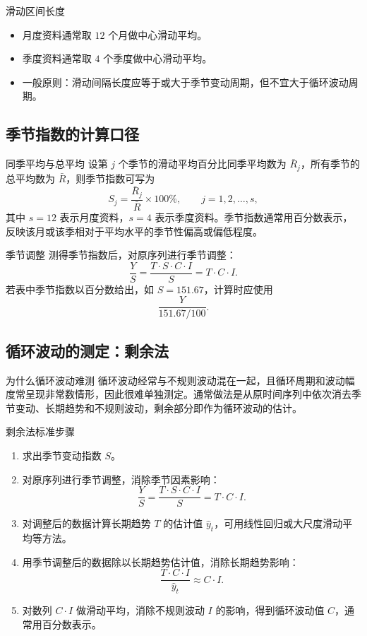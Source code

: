 \documentclass[UTF8,zihao=-4,fontset=fandol]{ctexart}
\begin{document}
\begin{warnbox}{滑动区间长度}
\begin{itemize}
  \item 月度资料通常取 $12$ 个月做中心滑动平均。
  \item 季度资料通常取 $4$ 个季度做中心滑动平均。
  \item 一般原则：滑动间隔长度应等于或大于季节变动周期，但不宜大于循环波动周期。
\end{itemize}
\end{warnbox}

\subsection{季节指数的计算口径}

\begin{keybox}{同季平均与总平均}
设第 $j$ 个季节的滑动平均百分比同季平均数为 $\bar R_j$，所有季节的总平均数为 $\bar R$，则季节指数可写为
\[
S_j=\frac{\bar R_j}{\bar R}\times 100\%,\qquad j=1,2,\ldots,s,
\]
其中 $s=12$ 表示月度资料，$s=4$ 表示季度资料。季节指数通常用百分数表示，反映该月或该季相对于平均水平的季节性偏高或偏低程度。
\end{keybox}

\begin{methodbox}{季节调整}
测得季节指数后，对原序列进行季节调整：
\[
\frac{Y}{S}
=\frac{T\cdot S\cdot C\cdot I}{S}
=T\cdot C\cdot I.
\]
若表中季节指数以百分数给出，如 $S=151.67$，计算时应使用
\[
\frac{Y}{151.67/100}.
\]
\end{methodbox}

\subsection{循环波动的测定：剩余法}

\begin{keybox}{为什么循环波动难测}
循环波动经常与不规则波动混在一起，且循环周期和波动幅度常呈现非常数情形，因此很难单独测定。通常做法是从原时间序列中依次消去季节变动、长期趋势和不规则波动，剩余部分即作为循环波动的估计。
\end{keybox}

\begin{methodbox}{剩余法标准步骤}
\begin{enumerate}
  \item 求出季节变动指数 $S$。
  \item 对原序列进行季节调整，消除季节因素影响：
  \[
  \frac{Y}{S}
  =\frac{T\cdot S\cdot C\cdot I}{S}
  =T\cdot C\cdot I.
  \]
  \item 对调整后的数据计算长期趋势 $T$ 的估计值 $\hat y_t$，可用线性回归或大尺度滑动平均等方法。
  \item 用季节调整后的数据除以长期趋势估计值，消除长期趋势影响：
  \[
  \frac{T\cdot C\cdot I}{\hat y_t}\approx C\cdot I.
  \]
  \item 对数列 $C\cdot I$ 做滑动平均，消除不规则波动 $I$ 的影响，得到循环波动值 $C$，通常用百分数表示。
\end{enumerate}
\end{methodbox}
\end{document}
